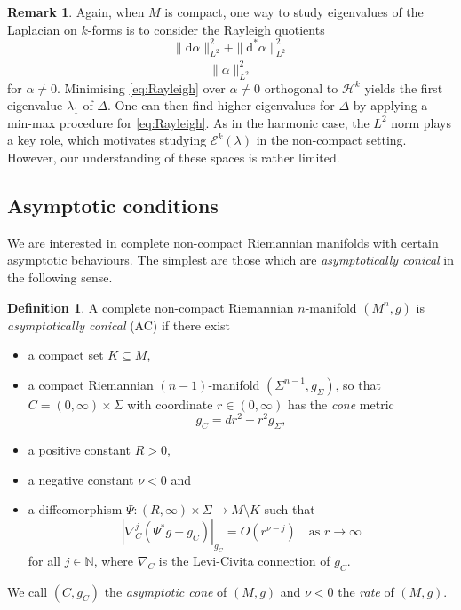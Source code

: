 \documentclass{article}
\theoremstyle{definition}
\newtheorem{dfn}[thm]{Definition}
\newtheorem{rmk}[thm]{Remark}
\numberwithin{thm}{section}
\numberwithin{equation}{section}
\def\d{\mathrm{d}}
\begin{document}
    \begin{rmk}
Again, when $M$ is compact, one way to study eigenvalues of the Laplacian on $k$-forms is to consider the Rayleigh quotients
\begin{equation}\label{eq:Rayleigh}
    \frac{\|\d\alpha\|_{L^2}^2+\|\d^*\alpha\|_{L^2}^2}{\|\alpha\|_{L^2}^2}
\end{equation}
for $\alpha\neq 0$.   Minimising \eqref{eq:Rayleigh} over $\alpha\neq 0$ orthogonal to $\mathcal{H}^k$ yields the first eigenvalue $\lambda_1$ of $\Delta$.  One can then find higher eigenvalues for $\Delta$ by applying a min-max procedure for \eqref{eq:Rayleigh}.  As in the harmonic case, the $L^2$ norm  plays a key role, which motivates studying $\mathcal{E}^k(\lambda)$ in the non-compact setting.  However, our understanding of these spaces is rather limited.  
    \end{rmk}

\subsection{Asymptotic conditions}

We are interested in complete non-compact Riemannian manifolds with certain asymptotic behaviours.  The simplest  are those which are \emph{asymptotically conical} in the following sense.

\begin{dfn}\label{dfn:AC} A complete non-compact Riemannian $n$-manifold $(M^n,g)$ is \emph{asymptotically conical} (AC)  if there exist
\begin{itemize}
    \item a compact set $K\subseteq M$, 
    \item a compact Riemannian $(n-1)$-manifold $(\Sigma^{n-1},g_{\Sigma})$, so that $C=(0,\infty)\times\Sigma$ with coordinate $r\in(0,\infty)$ has the \emph{cone} metric
   \begin{equation}\label{eq:cone.metric}
       g_C=dr^2+r^2g_{\Sigma},
   \end{equation}
     \item a positive constant $R>0$,
    \item a negative constant $\nu<0$ and
    \item a diffeomorphism $\Psi:(R,\infty)\times\Sigma \to M\setminus K$ such that 
  \begin{equation}\label{eq:AC}
    |\nabla_C^j(\Psi^*g-g_C)|_{g_C}=O(r^{\nu-j})\quad\text{as $r\to\infty$}
    \end{equation}
    for all $j\in\mathbb{N}$, where $\nabla_C$ is the Levi-Civita connection of $g_C$.
\end{itemize}
We call $(C,g_C)$ the \emph{asymptotic cone} of $(M,g)$ and $\nu<0$ the \emph{rate} of $(M,g)$.  
\end{dfn}
\end{document}
